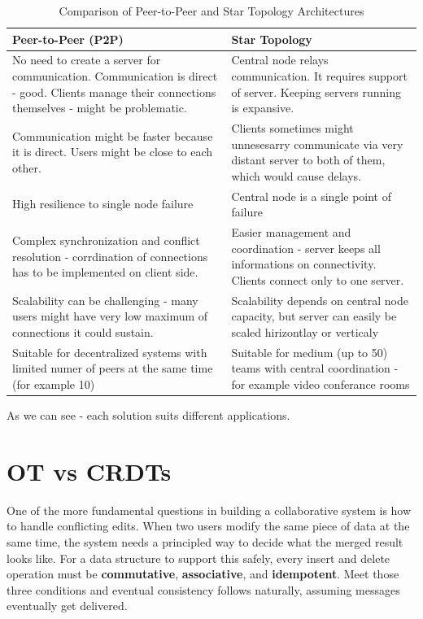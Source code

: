 \documentclass[a4paper,11pt,twoside]{report}
\theoremstyle{definition}
\begin{document}
\begin{table}[H]
	\centering
	\caption{Comparison of Peer-to-Peer and Star Topology Architectures}
	\begin{tabular}{|p{}|p{}|}
		\hline
		\textbf{Peer-to-Peer (P2P)} & \textbf{Star Topology} \\
		\hline
		No need to create a server for communication. Communication is direct - good. Clients manage their connections themselves - might be problematic.
		& Central node relays communication. It requires support of server. Keeping servers running is expansive.\\
		\hline
		Communication might be faster because it is direct. Users might be close to each other. &
		Clients sometimes might unnesesarry communicate via very distant server to both of them, which would cause delays. \\
		\hline
		High resilience to single node failure & Central node is a single point of failure \\
		\hline
		Complex synchronization and conflict resolution - corrdination of connections has to be implemented on client side. 
		& Easier management and coordination - server keeps all informations on connectivity. Clients connect only to one server. \\
		\hline
		Scalability can be challenging - many users might have very low maximum of connections it could sustain. & 
		Scalability depends on central node capacity, but server can easily be scaled hirizontlay or verticaly\\
		\hline
		Suitable for decentralized systems with limited numer of peers at the same time (for example 10) 
		& Suitable for medium (up to 50) teams with central coordination - for example video conferance rooms \\
		\hline
	\end{tabular}
\end{table}

As we can see - each solution suits different applications.


\section{OT vs CRDTs}

One of the more fundamental questions in building a collaborative system is how to handle conflicting edits.
 When two users modify the same piece of data at the same time, the system needs a principled
  way to decide what the merged result looks like. For a data structure to support this safely, 
  every insert and delete operation must be \textbf{commutative}, \textbf{associative}, and \textbf{idempotent}.
   Meet those three conditions and eventual consistency follows naturally, assuming 
   messages eventually get delivered.
\end{document}
